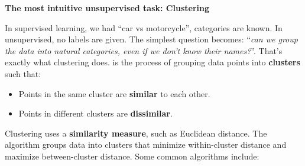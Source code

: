 \highspace
\begin{flushleft}
    \textcolor{Green3}{ \textbf{The most intuitive unsupervised task: Clustering}}
\end{flushleft}
In supervised learning, we had ``car vs motorcycle'', categories are known. In unsupervised, no labels are given. The simplest question becomes: ``\emph{can we group the data into natural categories, even if we don't know their names?}''. That's exactly what clustering does.  is the process of grouping data points into \textbf{clusters} such that:
\begin{itemize}
    \item Points in the same cluster are \textbf{similar} to each other.
    \item Points in different clusters are \textbf{dissimilar}.
\end{itemize}
Clustering uses a \textbf{similarity measure}, such as Euclidean distance. The algorithm groups data into clusters that minimize within-cluster distance and maximize between-cluster distance. Some common algorithms include:
